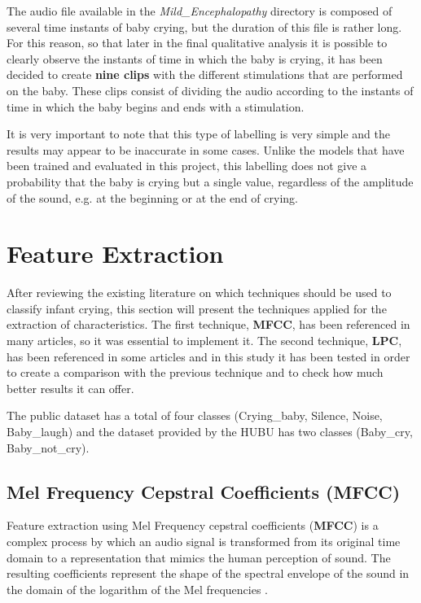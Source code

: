 \vspace{\baselineskip}

\begin{tcolorbox}
The audio file available in the \textit{Mild\_Encephalopathy} directory is composed of several time instants of baby crying, but the duration of this file is rather long. For this reason, so that later in the final qualitative analysis it is possible to clearly observe the instants of time in which the baby is crying, it has been decided to create \textbf{nine clips} with the different stimulations that are performed on the baby. These clips consist of dividing the audio according to the instants of time in which the baby begins and ends with a stimulation. 
\end{tcolorbox}

\newpage
It is very important to note that this type of labelling is very simple and the results may appear to be inaccurate in some cases. Unlike the models that have been trained and evaluated in this project, this labelling does not give a probability that the baby is crying but a single value, regardless of the amplitude of the sound, e.g. at the beginning or at the end of crying.


\section{Feature Extraction}
After reviewing the existing literature on which techniques should be used to classify infant crying, this section will present the techniques applied for the extraction of characteristics. The first technique, \textbf{MFCC}, has been referenced in many articles, so it was essential to implement it. The second technique, \textbf{LPC}, has been referenced in some articles and in this study it has been tested in order to create a comparison with the previous technique and to check how much better results it can offer. 

\begin{tcolorbox}
The public dataset has a total of four classes (Crying\_baby, Silence, Noise, Baby\_laugh) and the dataset provided by the HUBU has two classes (Baby\_cry, Baby\_not\_cry).
\end{tcolorbox}

\subsection{Mel Frequency Cepstral Coeﬃcients (MFCC)}
Feature extraction using Mel Frequency cepstral coefficients (\textbf{MFCC}) is a complex process by which an audio signal is transformed from its original time domain to a representation that mimics the human perception of sound. The resulting coefficients represent the shape of the spectral envelope of the sound in the domain of the logarithm of the Mel frequencies \cite{Abdul2022}.

